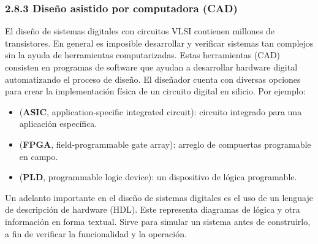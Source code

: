 \subsubsection*{2.8.3 Dise\~{n}o asistido por computadora (CAD)} El dise\~{n}o
de sistemas digitales con circuitos VLSI contienen millones de transistores. En
general es imposible desarrollar y verificar sistemas tan complejos sin la ayuda
de herramientas computarizadas. Estas herramientas (CAD) consisten en programas
de software que ayudan a desarrollar hardware digital automatizando el proceso
de dise\~{n}o. El dise\~{n}ador cuenta con diversas opciones para crear la
implementaci\'{o}n f\'{i}sica de un circuito digital en silicio. Por ejemplo:

\begin{itemize} \item (\textbf{ASIC}, application-specific integrated circuit):
          circuito integrado para una aplicaci\'{o}n espec\'{i}fica. \item (\textbf{FPGA},
          field-programmable gate array): arreglo de compuertas programable en campo.
    \item (\textbf{PLD}, programmable logic device): un dispositivo de l\'{o}gica
          programable. \end{itemize}

Un adelanto importante en el dise\~{n}o de sistemas digitales es el uso de un
lenguaje de descripci\'{o}n de hardware (HDL). Este representa diagramas de
l\'{o}gica y otra informaci\'{o}n en forma textual. Sirve para simular un
sistema antes de construirlo, a fin de verificar la funcionalidad y la
operaci\'{o}n.
